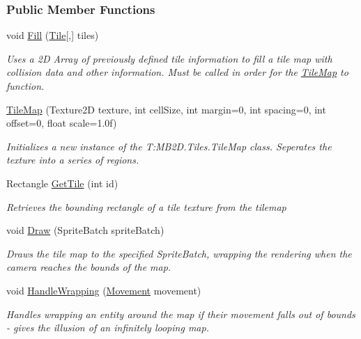 \subsubsection*{Public Member Functions}
\begin{DoxyCompactItemize}
\item 
void \hyperlink{class_m_b2_d_1_1_tiles_1_1_tile_map_acc786702f8dfb76227fcd76ce0b20510}{Fill} (\hyperlink{class_m_b2_d_1_1_tile}{Tile}\mbox{[},\mbox{]} tiles)
\begin{DoxyCompactList}\small\item\em Uses a 2D Array of previously defined tile information to fill a tile map with collision data and other information. Must be called in order for the \hyperlink{class_m_b2_d_1_1_tiles_1_1_tile_map}{Tile\+Map} to function. \end{DoxyCompactList}\item 
\hyperlink{class_m_b2_d_1_1_tiles_1_1_tile_map_a8618b4770e24bf8cdb327dfee48afeef}{Tile\+Map} (Texture2D texture, int cell\+Size, int margin=0, int spacing=0, int offset=0, float scale=1.\+0f)
\begin{DoxyCompactList}\small\item\em Initializes a new instance of the T\+:\+M\+B2\+D.\+Tiles.\+Tile\+Map class. Seperates the texture into a series of regions. \end{DoxyCompactList}\item 
Rectangle \hyperlink{class_m_b2_d_1_1_tiles_1_1_tile_map_a483549827f26a5282888728f20b56a8a}{Get\+Tile} (int id)
\begin{DoxyCompactList}\small\item\em Retrieves the bounding rectangle of a tile texture from the tilemap \end{DoxyCompactList}\item 
void \hyperlink{class_m_b2_d_1_1_tiles_1_1_tile_map_aa4c7f815bf7b9fc53a4dcf1a2b0df175}{Draw} (Sprite\+Batch sprite\+Batch)
\begin{DoxyCompactList}\small\item\em Draws the tile map to the specified Sprite\+Batch, wrapping the rendering when the camera reaches the bounds of the map. \end{DoxyCompactList}\item 
void \hyperlink{class_m_b2_d_1_1_tiles_1_1_tile_map_ad00d974648e7f3070133569e5e98d261}{Handle\+Wrapping} (\hyperlink{class_m_b2_d_1_1_entity_component_1_1_movement}{Movement} movement)
\begin{DoxyCompactList}\small\item\em Handles wrapping an entity around the map if their movement falls out of bounds -\/ gives the illusion of an infinitely looping map. \end{DoxyCompactList}\end{DoxyCompactItemize}
